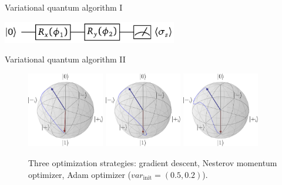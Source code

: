 \begin{frame}[fragile]{Variational quantum algorithm I}
	\begin{center}
	\includegraphics[width=3in]{pics/pennylane}
	\end{center}
	
\end{frame}
\begin{frame}{Variational quantum algorithm II}
	\begin{figure}
		\centering
		\includegraphics[width=0.3\textwidth]{pics/trajectories/1}
		\includegraphics[width=0.3\textwidth]{pics/trajectories/2}
		\includegraphics[width=0.3\textwidth]{pics/trajectories/3}
		\caption{Three optimization strategies: gradient descent,
		Nesterov momentum optimizer, Adam optimizer
		($var_\mathrm{init}=(0.5, 0.2)$). }
	\end{figure}
\end{frame}
